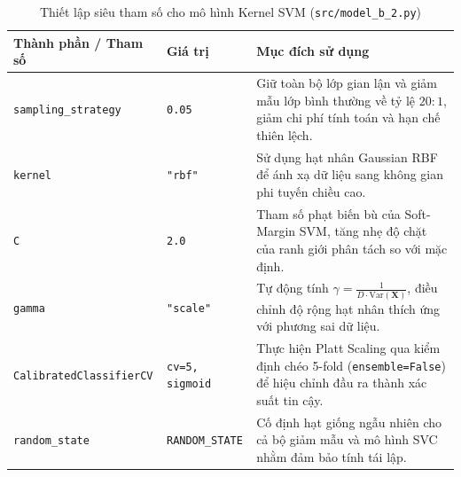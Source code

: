 \begin{table}[H]
\centering
\caption{Thiết lập siêu tham số cho mô hình Kernel SVM (\texttt{src/model\_b\_2.py})}
\label{tab:svm_hyperparams}
\renewcommand{\arraystretch}{1.2}
\begin{tabular}{|l|l|p{8.0cm}|}
\hline
\textbf{Thành phần / Tham số} & \textbf{Giá trị} & \textbf{Mục đích sử dụng} \\
\hline
\texttt{sampling\_strategy} & \texttt{0.05} & Giữ toàn bộ lớp gian lận và giảm mẫu lớp bình thường về tỷ lệ $20:1$, giảm chi phí tính toán và hạn chế thiên lệch. \\
\hline
\texttt{kernel} & \texttt{"rbf"} & Sử dụng hạt nhân Gaussian RBF để ánh xạ dữ liệu sang không gian phi tuyến chiều cao. \\
\hline
\texttt{C} & \texttt{2.0} & Tham số phạt biến bù của Soft-Margin SVM, tăng nhẹ độ chặt của ranh giới phân tách so với mặc định. \\
\hline
\texttt{gamma} & \texttt{"scale"} & Tự động tính $\gamma = \frac{1}{D \cdot \text{Var}(\mathbf{X})}$, điều chỉnh độ rộng hạt nhân thích ứng với phương sai dữ liệu. \\
\hline
\texttt{CalibratedClassifierCV} & \texttt{cv=5, sigmoid} & Thực hiện Platt Scaling qua kiểm định chéo 5-fold (\texttt{ensemble=False}) để hiệu chỉnh đầu ra thành xác suất tin cậy. \\
\hline
\texttt{random\_state} & \texttt{RANDOM\_STATE} & Cố định hạt giống ngẫu nhiên cho cả bộ giảm mẫu và mô hình SVC nhằm đảm bảo tính tái lập. \\
\hline
\end{tabular}
\end{table}